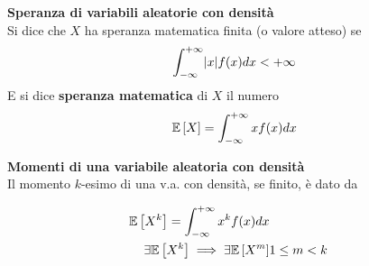 \begin{defn}
    \textbf{Speranza di variabili aleatorie con densità} \\
    Si dice che $X$ ha speranza matematica finita (o valore atteso) se
    \begin{equation*}
        \begin{aligned}
            \int_{-\infty}^{+\infty} \lvert x\rvert f(x) dx < +\infty
        \end{aligned}
    \end{equation*}
    E si dice \textbf{speranza matematica} di $X$ il numero
    \begin{equation*}
        \begin{aligned}
            \mathbb{E}\left[X\right] = \int_{-\infty}^{+\infty} x f(x) dx
        \end{aligned}
    \end{equation*}
\end{defn}

\begin{defn}
    \textbf{Momenti di una variabile aleatoria con densità} \\
    Il momento $k$-esimo di una v.a. con densità, se finito, è dato da

    \begin{equation*}
        \begin{aligned}
            \mathbb{E}\left[X^k\right] = \int_{-\infty}^{+\infty} x^k f(x) dx \\
            \exists \mathbb{E}\left[X^k\right] \implies \exists \mathbb{E}\left[X^m\right] & 1 \leq m < k
        \end{aligned}
    \end{equation*}
\end{defn}


